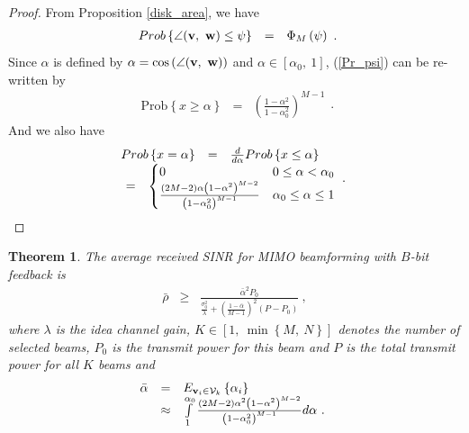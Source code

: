\documentclass[a4paper,10pt,fleqn, twocolumn]{IEEEtran}
\newtheorem{theorem}{Theorem}
\newcommand{\bv}{{\bf v}}
\newcommand{\bw}{{\bf w}}
\begin{document}
\begin{proof}
From Proposition \ref{disk_area}, we have
\begin{equation}\label{Pr_psi}
\begin{array}{rcl}
\mbox{Prob}\left\{\angle(\bv,\
\bw)\leq\psi\right\}&=&\Phi_{M}\left(\psi\right)
\end{array}.
\end{equation}
\noindent Since $\alpha$ is defined by $\alpha =
\cos\left(\angle(\bv,\ \bw\right))$ and
$\alpha\in\left[\alpha_{0},\ 1\right]$, (\ref{Pr_psi}) can be
re-written by
\begin{equation}\label{P_alpha}
\begin{array}{rcl}
\mbox{Prob}\left\{x\geq\alpha\right\}&=&\left(\frac{1-\alpha^2}{1-\alpha_{0}^2}\right)^{M-1}
\end{array}.
\end{equation}
\noindent And we also have
\begin{equation}\hspace{-0.10in}
\begin{array}{rcl}
\mbox{Prob}\left\{x=\alpha\right\}&=&\frac{d}{d\alpha}\mbox{Prob}\left\{x\leq\alpha\right\}\\
&\hspace{-1.80in}=&\hspace{-0.90in}\begin{cases}
0 & 0\leq \alpha < \alpha_{0} \\
\frac{\left(2M-2\right)\alpha\left(1-\alpha^2\right)^{M-2}}{\left(1-\alpha_{0}^{2}\right)^{M-1}}
& \alpha_{0}\leq\alpha\leq 1
\end{cases}
\end{array}.\label{p_alpha}
\end{equation}

\end{proof}

\begin{theorem} The average received SINR for MIMO beamforming with
$B$-bit feedback is
\begin{equation}
\begin{array}{rcl}
\bar\rho_{}&\geq&\frac{\bar{\alpha}^2
P_{0}}{\frac{\sigma_{0}^{2}}{\lambda}+\left(\frac{1-\bar{\alpha}}{M-1}\right)^{2}
\left(P-P_{0}\right)}\ ,
\end{array}
\end{equation}
\noindent where $\lambda$ is the idea channel gain, $K\in\left[1,\
\min\left\{M,\ N\right\}\right]$ denotes the number of selected
beams, $P_0$ is the transmit power for this beam and $P$ is the
total transmit power for all $K$ beams and
\begin{equation}\hspace{-0.05in}\label{alpha_mean}
\begin{array}{rcl}
\bar\alpha&=&\mbox{E}_{\bv_{i}\in{\cal
V}_{k}}\left\{\alpha_{i}\right\}\\
&\approx&\int\limits_{1}^{\alpha_{0}}\frac{\left(2M-2\right)\alpha^2\left(1-\alpha^2\right)^{M-2}}{\left(1-\alpha_{0}^{2}\right)^{M-1}}d\alpha\
.
\end{array}
\end{equation}

\end{theorem}
\end{document}
